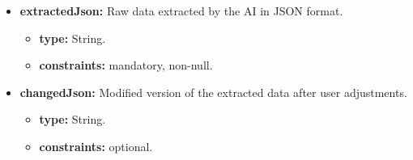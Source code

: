 \begin{itemize} [leftmargin=0.75cm, noitemsep, label=\textbullet]
    \begin{itemize} [leftmargin=0.75cm, noitemsep, label=$\circ$]

        \item \textbf{type:} DateTime.

        \item \textbf{constraints:} mandatory, non-null.

    \end{itemize}

    \item \textbf{extractedJson:} Raw data extracted by the AI in JSON format.
    
    \begin{itemize} [leftmargin=0.75cm, noitemsep, label=$\circ$]

        \item \textbf{type:} String.

        \item \textbf{constraints:} mandatory, non-null.

    \end{itemize}

    \item \textbf{changedJson:} Modified version of the extracted data after user adjustments.
    
    \begin{itemize} [leftmargin=0.75cm, noitemsep, label=$\circ$]

        \item \textbf{type:} String.

        \item \textbf{constraints:} optional.

    \end{itemize}

\end{itemize}
